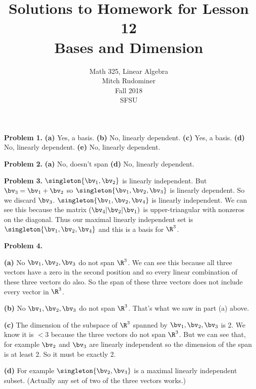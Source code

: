 \documentclass[oneside,12pt]{amsart}
\begin{document}
\title{Solutions to Homework for Lesson 12 \\ Bases and Dimension}
\author{Math 325, Linear Algebra \\ Mitch Rudominer \\ Fall 2018 \\ SFSU }
\date{}

\maketitle


\textbf{Problem 1.}
\textbf{(a)} Yes, a basis.
\textbf{(b)} No, linearly dependent.
\textbf{(c)} Yes, a basis.
\textbf{(d)} No, linearly dependent.
\textbf{(e)} No, linearly dependent.
\bigskip

\textbf{Problem 2.}
\textbf{(a)} No, doesn't span
\textbf{(d)} No, linearly dependent.

\bigskip


\textbf{Problem 3.} $\singleton{\bv_1,\bv_2}$ is linearly independent.
But $\bv_3 = \bv_1+\bv_2$ so $\singleton{\bv_1,\bv_2,\bv_3}$ is linearly
dependent. So we discard $\bv_3$. $\singleton{\bv_1,\bv_2,\bv_4}$ is linearly
independent. We can see this because the matrix
$\left(\bv_4 \vert \bv_2 \vert \bv_1 \right)$ is upper-triangular with
nonzeros on the diagonal. Thus our maximal linearly independent set is
$\singleton{\bv_1,\bv_2,\bv_4}$ and this is a basis for $\R^3$.

\bigskip

\textbf{Problem 4.}

\textbf{(a)} No $\bv_1,\bv_2,\bv_3$ do not span $\R^3$. We can see this because
all three vectors have a zero in the second position and so every linear combination
of these three vectors do also. So the span of these three vectors does not include
every vector in $\R^3$.

\bigskip



\textbf{(b)} No $\bv_1,\bv_2,\bv_3$ do not span $\R^3$. That's what we saw in part (a) above.

\bigskip


\textbf{(c)} The dimension of the subspace of $\R^3$ spanned by $\bv_1,\bv_2,\bv_3$ is 2.
We know it is $<3$ because the three vectors do not span $\R^3$. But we can see that,
for example $\bv_2$ and $\bv_3$ are linearly independent so the dimension of the
span is at least 2. So it must be exactly 2.

\bigskip


\textbf{(d)} For example $\singleton{\bv_2,\bv_3}$ is a maximal linearly independent subset.
(Actually any set of two of the three vectors works.)
\end{document}
